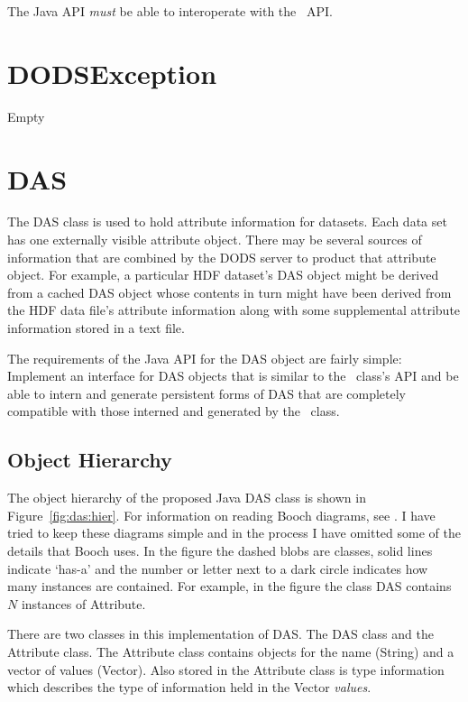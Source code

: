 \documentclass[12pt]{article}
\begin{document}
The Java API {\em must} be able to interoperate with the \Cpp\ API\@.

\section{DODSException}

Empty

\section{DAS}

The DAS class is used to hold attribute information for datasets. Each data
set has one externally visible attribute object. There may be several sources
of information that are combined by the DODS server to product that
attribute object. For example, a particular HDF dataset's DAS object might be
derived from a cached DAS object whose contents in turn might have been
derived from the HDF data file's attribute information along with some
supplemental attribute information stored in a text file. 

The requirements of the Java API for the DAS object are fairly simple:
Implement an interface for DAS objects that is similar to the \Cpp\  class's
API and be able to intern and generate persistent forms of DAS that are
completely compatible with those interned and generated by the \Cpp\  class.

\subsection{Object Hierarchy}
\label{das:object-hierarchy}

The object hierarchy of the proposed Java DAS class is shown in
Figure~\ref{fig:das:hier}. For information on reading Booch diagrams, see
\cite{booch:oo-analysis}. I have tried to keep these diagrams simple and in
the process I have omitted some of the details that Booch uses. In the figure
the dashed blobs are classes, solid lines indicate `has-a' and the number or
letter next to a dark circle indicates how many instances are contained. For
example, in the figure the class DAS contains $N$ instances of Attribute.

There are two classes in this implementation of DAS. The DAS class and the
Attribute class. The Attribute class contains objects for the name (String)
and a vector of values (Vector). Also stored in the Attribute class is type
information which describes the type of information held in the Vector
{\em values}. 
\end{document}
